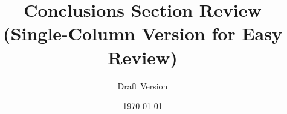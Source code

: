 \documentclass[12pt,a4paper]{article}
\begin{document}
\title{Conclusions Section Review\\
\large (Single-Column Version for Easy Review)}
\author{Draft Version}
\date{\today}
\maketitle



\end{document}
